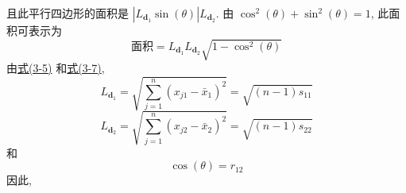 且此平行四边形的面积是 $|L_{\mathbf{d}_{1}}\sin(\theta)|L_{\mathbf{d}_{2}}$. 由 $\cos^{2}(\theta)+\sin^{2}(\theta)=1$, 此面积可表示为
\[
\text{面积}=L_{\mathbf{d}_{1}}L_{\mathbf{d}_{2}}\sqrt{1-\cos^{2}(\theta)}
\]
由\hyperref[eq:3-5]{式(3-5)} 和\hyperref[eq:3-7]{式(3-7)},
\[
L_{\mathbf{d}_{1}}=\sqrt{\sum_{j=1}^{n}(x_{j1}-\bar{x}_{1})^{2}}=\sqrt{(n-1)s_{11}}
\]
\[
L_{\mathbf{d}_{2}}=\sqrt{\sum_{j=1}^{n}(x_{j2}-\bar{x}_{2})^{2}}=\sqrt{(n-1)s_{22}}
\]
和
\[
\cos(\theta)=r_{12}
\]
因此,
